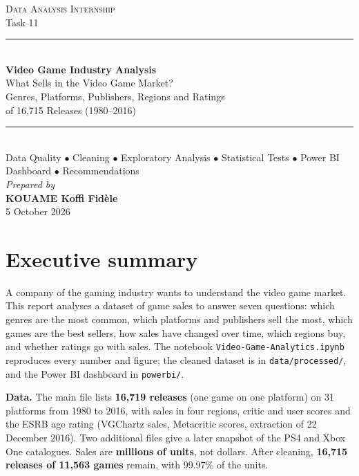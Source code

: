 \documentclass[12pt,a4paper]{article}
\begin{document}
\begin{titlepage}\centering
\singlespacing
\vspace*{3cm}
{\large\scshape Data Analysis Internship}\\[0.4cm]
{\normalsize Task 11}\\[2.0cm]
\rule{\linewidth}{0.5pt}\\[0.8cm]
{\LARGE\bfseries Video Game Industry Analysis}\\[0.6cm]
{\large What Sells in the Video Game Market?\\ Genres, Platforms, Publishers, Regions and Ratings\\ of 16{,}715 Releases (1980--2016)}\\[0.8cm]
\rule{\linewidth}{0.5pt}\\[1.2cm]
{\normalsize Data Quality $\bullet$ Cleaning $\bullet$ Exploratory Analysis $\bullet$ Statistical Tests
$\bullet$ Power BI Dashboard $\bullet$ Recommendations}\\[3.0cm]
{\large\itshape Prepared by}\\[0.5cm]
{\Large\bfseries KOUAME Koffi Fid\`ele}\\[0.6cm]
{\large 5 October 2026}
\vfill\end{titlepage}

\singlespacing
\tableofcontents\newpage
\onehalfspacing

\section{Executive summary}

A company of the gaming industry wants to understand the video game market. This report
analyses a dataset of game sales to answer seven questions: which genres are the most
common, which platforms and publishers sell the most, which games are the best sellers,
how sales have changed over time, which regions buy, and whether ratings go with sales.
The notebook \texttt{Video-Game-Analytics.ipynb} reproduces every number and figure; the
cleaned dataset is in \texttt{data/processed/}, and the Power BI dashboard in
\texttt{powerbi/}.

\textbf{Data.} The main file lists \textbf{16{,}719 releases} (one game on one platform) on
31 platforms from 1980 to 2016, with sales in four regions, critic and user scores and the
ESRB age rating (VGChartz sales, Metacritic scores, extraction of 22 December 2016). Two
additional files give a later snapshot of the PS4 and Xbox One catalogues. Sales are
\textbf{millions of units}, not dollars. After cleaning, \textbf{16{,}715 releases of
11{,}563 games} remain, with 99.97\% of the units.
\end{document}
